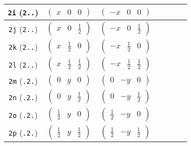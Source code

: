 \documentclass[fleqn,9pt,landscape]{jsarticle}
\begin{document}
\begin{center}
\begin{longtable}{ccccccc}
{\tt 2i} ({\tt 2..}) & $ \begin{pmatrix} x & 0 & 0 \end{pmatrix} $ & $ \begin{pmatrix} - x & 0 & 0 \end{pmatrix} $ & $  $ & $  $ \\ \hline
{\tt 2j} ({\tt 2..}) & $ \begin{pmatrix} x & 0 & \frac{1}{2} \end{pmatrix} $ & $ \begin{pmatrix} - x & 0 & \frac{1}{2} \end{pmatrix} $ & $  $ & $  $ \\ \hline
{\tt 2k} ({\tt 2..}) & $ \begin{pmatrix} x & \frac{1}{2} & 0 \end{pmatrix} $ & $ \begin{pmatrix} - x & \frac{1}{2} & 0 \end{pmatrix} $ & $  $ & $  $ \\ \hline
{\tt 2l} ({\tt 2..}) & $ \begin{pmatrix} x & \frac{1}{2} & \frac{1}{2} \end{pmatrix} $ & $ \begin{pmatrix} - x & \frac{1}{2} & \frac{1}{2} \end{pmatrix} $ & $  $ & $  $ \\ \hline
{\tt 2m} ({\tt .2.}) & $ \begin{pmatrix} 0 & y & 0 \end{pmatrix} $ & $ \begin{pmatrix} 0 & - y & 0 \end{pmatrix} $ & $  $ & $  $ \\ \hline
{\tt 2n} ({\tt .2.}) & $ \begin{pmatrix} 0 & y & \frac{1}{2} \end{pmatrix} $ & $ \begin{pmatrix} 0 & - y & \frac{1}{2} \end{pmatrix} $ & $  $ & $  $ \\ \hline
{\tt 2o} ({\tt .2.}) & $ \begin{pmatrix} \frac{1}{2} & y & 0 \end{pmatrix} $ & $ \begin{pmatrix} \frac{1}{2} & - y & 0 \end{pmatrix} $ & $  $ & $  $ \\ \hline
{\tt 2p} ({\tt .2.}) & $ \begin{pmatrix} \frac{1}{2} & y & \frac{1}{2} \end{pmatrix} $ & $ \begin{pmatrix} \frac{1}{2} & - y & \frac{1}{2} \end{pmatrix} $ & $  $ & $  $ \\ \hline

\end{longtable}
\end{center}
\end{document}
